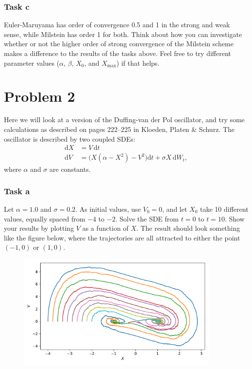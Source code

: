 \documentclass[a4paper]{article}
\begin{document}
\subsubsection*{Task c}
Euler-Maruyama has order of convergence 0.5 and 1 in the strong and weak sense, while Milstein has order 1 for both. Think about how you can investigate whether or not the higher order of strong convergence of the Milstein scheme makes a difference to the results of the tasks above. Feel free to try different parameter values ($\alpha$, $\beta$, $X_0$, and $X_\mathrm{max}$) if that helps.


\section*{Problem 2}

Here we will look at a version of the Duffing-van der Pol oscillator, and try some calculations as described on pages 222--225 in Kloeden, Platen \& Schurz. The oscillator is described by two coupled SDEs:
\begin{align}
    \label{eq:vdp}
\mathrm{d}X &= V\, \mathrm{d}t \\
\mathrm{d}V &= \big(X(\alpha-X^2) - V^2\big) \mathrm{d}t + \sigma X \, \mathrm{d}W_t,
\end{align}
where $\alpha$ and $\sigma$ are constants.


\subsubsection*{Task a}

Let $\alpha=1.0$ and $\sigma=0.2$. As initial values, use $V_0=0$, and let $X_0$ take 10 different values, equally spaced from $-4$ to $-2$. Solve the SDE from $t=0$ to $t=10$. Show your results by plotting $V$ as a function of $X$. The result should look something like the figure below, where the trajectories are all attracted to either the point $(-1, 0)$ or $(1, 0)$.

\begin{figure}[!!h]
    \centering
    \includegraphics[width=0.9\textwidth]{fig/exercise3_duffing_vdp.pdf}
\end{figure}
\end{document}
